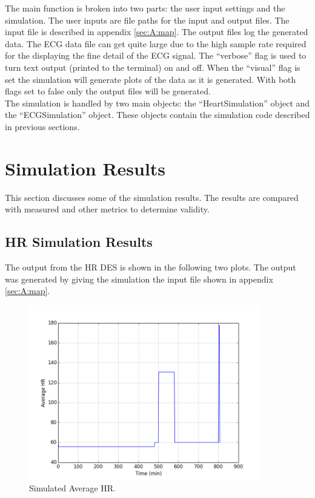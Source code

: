 \documentclass[paper=a4, fontsize=11pt]{scrartcl}
\numberwithin{equation}{section}		%
\numberwithin{figure}{section}			%
\numberwithin{table}{section}		    %
\begin{document}
The main function is broken into two parts: the user input settings and the simulation. The user
inputs are file paths for the input and output files. The input file is described in appendix 
\ref{sec:A:map}. The output files log the generated data. The ECG data file can get quite large
due to the high sample rate required for the displaying the fine detail of the ECG signal. The
``verbose'' flag is used to turn text output (printed to the terminal) on and off. When the 
``visual'' flag is set the simulation will generate plots of the data as it is generated. With 
both flags set to false only the output files will be generated.\\

The simulation is handled by two main objects: the ``HeartSimulation'' object and the 
``ECGSimulation'' object. These objects contain the simulation code described in previous sections.

\section{Simulation Results}
This section discusses some of the simulation results. The results are compared with measured and
other metrics to determine validity.

\subsection{HR Simulation Results}
The output from the HR DES is shown in the following two plots. The output was generated by giving
the simulation the input file shown in appendix \ref{sec:A:map}.

\begin{figure}[H]
	\begin{center} 
		\includegraphics[height=3in,width=4in]{avg_hr} 
		\caption{Simulated Average HR. \label{fig:hr}} 
	\end{center} 
\end{figure}
\end{document}

